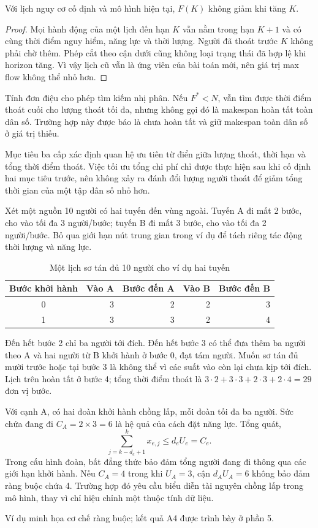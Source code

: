 \begin{dinhly}Với lịch nguy cơ cố định và mô hình hiện tại, $F(K)$ không giảm khi tăng $K$.\end{dinhly}
\begin{proof}
Mọi hành động của một lịch đến hạn $K$ vẫn nằm trong hạn $K+1$ và có cùng thời điểm nguy hiểm, năng lực và thời lượng. Người đã thoát trước $K$ không phải chờ thêm. Phép cắt theo cận dưới cũng không loại trạng thái đã hợp lệ khi horizon tăng. Vì vậy lịch cũ vẫn là ứng viên của bài toán mới, nên giá trị max flow không thể nhỏ hơn.
\end{proof}

Tính đơn điệu cho phép tìm kiếm nhị phân. Nếu $F^*<N$, vẫn tìm được thời điểm thoát cuối cho lượng thoát tối đa, nhưng không gọi đó là makespan hoàn tất toàn dân số. Trường hợp này được báo là chưa hoàn tất và giữ makespan toàn dân số ở giá trị thiếu.

Mục tiêu ba cấp xác định quan hệ ưu tiên từ điển giữa lượng thoát, thời hạn và tổng thời điểm thoát. Việc tối ưu tổng chi phí chỉ được thực hiện sau khi cố định hai mục tiêu trước, nên không xảy ra đánh đổi lượng người thoát để giảm tổng thời gian của một tập dân số nhỏ hơn.

Xét một nguồn 10 người có hai tuyến đến vùng ngoài. Tuyến A đi mất 2 bước, cho vào tối đa 3 người/bước; tuyến B đi mất 3 bước, cho vào tối đa 2 người/bước. Bỏ qua giới hạn nút trung gian trong ví dụ để tách riêng tác động thời lượng và năng lực.

\begin{table}[htbp]\centering\caption{Một lịch sơ tán đủ 10 người cho ví dụ hai tuyến}
\small\begin{tabular}{crrrr}\toprule Bước khởi hành & Vào A & Bước đến A & Vào B & Bước đến B\\\midrule
0 & 3 & 2 & 2 & 3\\1 & 3 & 3 & 2 & 4\\\bottomrule\end{tabular}\end{table}
Đến hết bước 2 chỉ ba người tới đích. Đến hết bước 3 có thể đưa thêm ba người theo A và hai người từ B khởi hành ở bước 0, đạt tám người. Muốn sơ tán đủ mười trước hoặc tại bước 3 là không thể vì các suất vào còn lại chưa kịp tới đích. Lịch trên hoàn tất ở bước 4; tổng thời điểm thoát là $3\cdot2+3\cdot3+2\cdot3+2\cdot4=29$ đơn vị bước.

Với cạnh A, có hai đoàn khởi hành chồng lấp, mỗi đoàn tối đa ba người. Sức chứa đang đi $C_A=2\times3=6$ là hệ quả của cách đặt năng lực. Tổng quát,
\begin{equation}\sum_{j=k-d_e+1}^{k}x_{e,j}\le d_eU_e=C_e.\end{equation}
Trong cấu hình đoàn, bất đẳng thức bảo đảm tổng người đang đi thông qua các giới hạn khởi hành. Nếu $C_A=4$ trong khi $U_A=3$, cận $d_AU_A=6$ không bảo đảm ràng buộc chứa 4. Trường hợp đó yêu cầu biểu diễn tài nguyên chồng lấp trong mô hình, thay vì chỉ hiệu chỉnh một thuộc tính dữ liệu.

Ví dụ minh họa cơ chế ràng buộc; kết quả A4 được trình bày ở phần 5.

